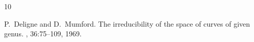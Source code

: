 \begin{thebibliography}{10}

P.~Deligne and D.~Mumford.
\newblock The irreducibility of the space of curves of given genus.
, 36:75--109, 1969.

\end{thebibliography}
